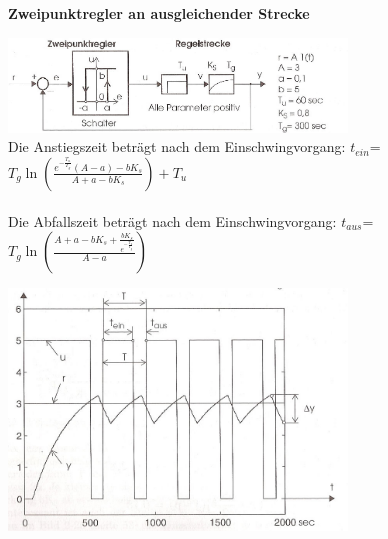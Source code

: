 	\vspace{.5cm}
		\textbf{Zweipunktregler an ausgleichender Strecke } \\
		\begin{minipage}{9cm}
 		\includegraphics[width=9cm]{./bilder/ZweipunktreglerTotglied2.jpg}\\
			Die Anstiegszeit beträgt nach dem Einschwingvorgang:
			$t_{ein}$=$T_g\ln(\frac{e^{-\frac{T_u}{T_g}}(A-a)-b K_s}{A+a-b K_s})+T_u$\\ \\
			Die Abfallszeit beträgt nach dem Einschwingvorgang:
			$t_{aus}$=$T_g\ln(\frac{A+a-b
			K_s+\frac{b K_s}{e^{-\frac{T_u}{T_g}}}}{A-a})$\\
        \end{minipage}
		\begin{minipage}{9cm}
		\includegraphics[width=9cm]{./bilder/ZweipunktreglerTotglied_dia.jpg}			
        \end{minipage}
    
